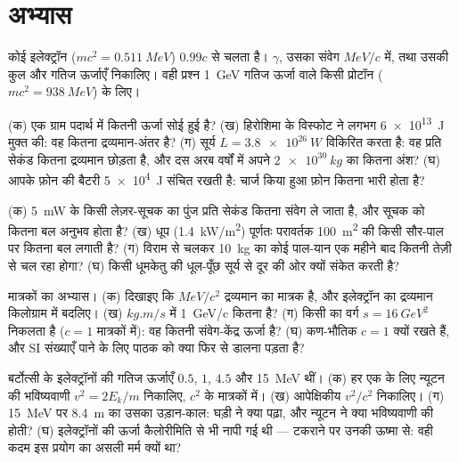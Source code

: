 \section{अभ्यास}

\begin{exercise}[$\star$]\label{exo:b3:relativistic-dynamics:1}
कोई इलेक्ट्रॉन ($mc^2 = \qty{0.511}{MeV}$) $0.99c$ से चलता है।
$\gamma$, उसका संवेग $\unit{MeV}/c$ में, तथा उसकी कुल और गतिज
ऊर्जाएँ निकालिए। वही प्रश्न \qty{1}{GeV} गतिज ऊर्जा वाले किसी
प्रोटॉन ($mc^2 = \qty{938}{MeV}$) के लिए।
\end{exercise}

\begin{exercise}[$\star$]\label{exo:b3:relativistic-dynamics:2}
(क) एक ग्राम पदार्थ में कितनी ऊर्जा सोई हुई है? (ख) हिरोशिमा के
विस्फोट ने लगभग \qty{6e13}{J} मुक्त की: वह कितना द्रव्यमान-अंतर है?
(ग) सूर्य $L = \qty{3.8e26}{W}$ विकिरित करता है: वह प्रति सेकंड कितना
द्रव्यमान छोड़ता है, और दस अरब वर्षों में अपने $\qty{2e30}{kg}$ का
कितना अंश? (घ) आपके फ़ोन की बैटरी \qty{5e4}{J} संचित रखती है: चार्ज
किया हुआ फ़ोन कितना भारी होता है?
\end{exercise}

\begin{exercise}[$\star$]\label{exo:b3:relativistic-dynamics:3}
(क) \qty{5}{mW} के किसी लेज़र-सूचक का पुंज प्रति सेकंड कितना संवेग ले
जाता है, और सूचक को कितना बल अनुभव होता है? (ख) धूप
(\qty{1.4}{kW/m^2}) पूर्णतः परावर्तक \qty{100}{m^2} की किसी सौर-पाल
पर कितना बल लगाती है? (ग) विराम से चलकर \qty{10}{kg} का कोई
पाल-यान एक महीने बाद कितनी तेज़ी से चल रहा होगा? (घ) किसी धूमकेतु की
धूल-पूँछ सूर्य से दूर की ओर क्यों संकेत करती है?
\end{exercise}

\begin{exercise}[$\star$]\label{exo:b3:relativistic-dynamics:4}
मात्रकों का अभ्यास। (क) दिखाइए कि $\unit{MeV}/c^2$ द्रव्यमान का
मात्रक है, और इलेक्ट्रॉन का द्रव्यमान किलोग्राम में बदलिए। (ख)
$\unit{kg.m/s}$ में \qty{1}{GeV/c} कितना है? (ग) किसी 
का वर्ग $s = \qty{16}{GeV^2}$ निकलता है ($c = 1$ मात्रकों में): वह
कितनी संवेग-केंद्र ऊर्जा है? (घ) कण-भौतिक
$c = 1$ क्यों रखते हैं, और SI संख्याएँ पाने के लिए पाठक को क्या फिर से
डालना पड़ता है?
\end{exercise}

\begin{exercise}[$\star\star$]\label{exo:b3:relativistic-dynamics:5}
बर्टोत्सी के इलेक्ट्रॉनों की गतिज ऊर्जाएँ $0.5$, $1$, $4.5$ और
\qty{15}{MeV} थीं। (क) हर एक के लिए न्यूटन की भविष्यवाणी $v^2 = 2E_k/m$
निकालिए, $c^2$ के मात्रकों में। (ख) आपेक्षिकीय $v^2/c^2$ निकालिए। (ग)
\qty{15}{MeV} पर \qty{8.4}{m} का उसका उड़ान-काल: घड़ी ने क्या पढ़ा, और
न्यूटन ने क्या भविष्यवाणी की होती? (घ) इलेक्ट्रॉनों की ऊर्जा
कैलोरीमिति से भी नापी गई थी --- टकराने पर उनकी ऊष्मा से:
वही कदम इस प्रयोग का असली मर्म क्यों था?
\end{exercise}

